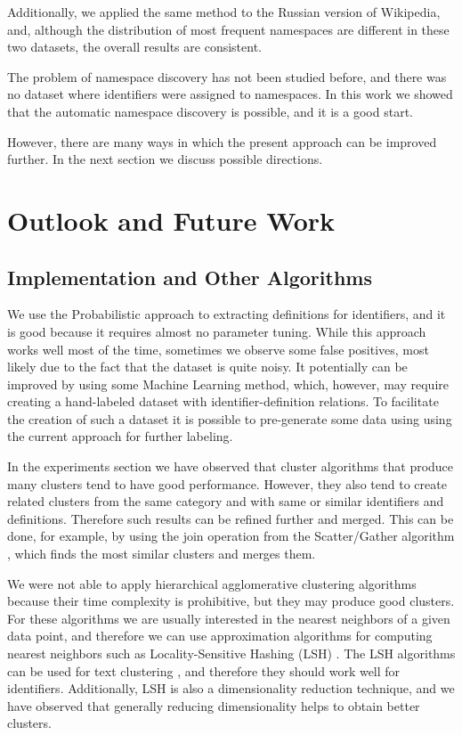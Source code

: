 Additionally, we applied the same method to the Russian version of Wikipedia, 
and, although the distribution of most frequent namespaces are different 
in these two datasets, the overall results are consistent. 


The problem of namespace discovery has not been studied before, and there was 
no dataset where identifiers were assigned to namespaces. 
In this work we showed that the automatic namespace discovery is possible,
and it is a good start. 

However, there are many ways in which the present approach can be improved further.
In the next section we discuss possible directions.


\section{Outlook and Future Work} \label{sec:future-work}

\subsection{Implementation and Other Algorithms}  %

We use the Probabilistic approach to extracting definitions for identifiers, and
it is good because it requires almost no parameter tuning.
While this approach works well most of the time, sometimes we observe
some false positives, most likely due to the fact that the dataset is
quite noisy. It potentially can be improved by using some Machine Learning
method, which, however, may require creating a hand-labeled dataset
with identifier-definition relations. To facilitate the creation of such a
dataset it is possible to pre-generate some data using using the current approach
for further labeling.

In the experiments section we have observed that cluster algorithms that produce
many clusters tend to have good performance. However, they also tend to create related
clusters from the same category and with same or similar identifiers and
definitions. Therefore such results can be refined further and merged.
This can be done, for example, by using the join operation from
the Scatter/Gather algorithm \cite{cutting1992scatter}, which finds the most
similar clusters and merges them.

We were not able to apply hierarchical agglomerative clustering algorithms because
their time complexity is prohibitive, but they may produce good clusters.
For these algorithms we are usually interested in the nearest neighbors of a given
data point, and therefore we can use approximation algorithms for computing nearest
neighbors such as Locality-Sensitive Hashing (LSH) \cite{leskovec2014mining}.
The LSH algorithms can be used for text clustering \cite{ravichandran2005randomized},
and therefore they should work well for identifiers. Additionally, LSH is also a
dimensionality reduction technique, and we have observed that generally
reducing dimensionality helps to obtain better clusters.

